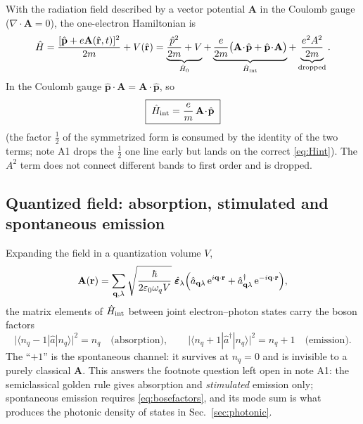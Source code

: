 \documentclass[11pt,a4paper]{article}
\numberwithin{equation}{section}
\newcommand{\eps}{\varepsilon}
\newcommand{\epsz}{\varepsilon_0}
\newcommand{\rme}{\mathrm{e}}
\begin{document}
With the radiation field described by a vector potential $\mathbf{A}$
in the Coulomb gauge ($\nabla\!\cdot\!\mathbf{A}=0$), the one-electron
Hamiltonian is
\begin{equation}
\hat H=\frac{[\hat{\mathbf p}+e\mathbf A(\hat{\mathbf r},t)]^2}{2m}+V(\hat{\mathbf r})
      =\underbrace{\frac{\hat p^2}{2m}+V}_{\hat H_0}
       +\underbrace{\frac{e}{2m}\bigl(\mathbf A\!\cdot\!\hat{\mathbf p}
        +\hat{\mathbf p}\!\cdot\!\mathbf A\bigr)}_{\hat H_{\rm int}}
       +\underbrace{\frac{e^2A^2}{2m}}_{\text{dropped}} .
\end{equation}
In the Coulomb gauge $\hat{\mathbf p}\!\cdot\!\mathbf A
=\mathbf A\!\cdot\!\hat{\mathbf p}$, so
\begin{equation}
\boxed{\;\hat H_{\rm int}=\frac{e}{m}\,\mathbf A\!\cdot\!\hat{\mathbf p}\;}
\label{eq:Hint}
\end{equation}
(the factor $\tfrac12$ of the symmetrized form is consumed by the
identity of the two terms; note A1 drops the $\tfrac12$ one line early
but lands on the correct \eqref{eq:Hint}).  The $A^2$ term does not
connect different bands to first order and is dropped.

\subsection{Quantized field: absorption, stimulated and spontaneous emission}
\label{sec:quantized}

Expanding the field in a quantization volume $V$,
\begin{equation}
\mathbf A(\mathbf r)=\sum_{\mathbf q,\lambda}
\sqrt{\frac{\hbar}{2\epsz\omega_q V}}\;\hat{\bm\eps}_\lambda
\Bigl(\hat a_{\mathbf q\lambda}\,\rme^{i\mathbf q\cdot\mathbf r}
     +\hat a^\dagger_{\mathbf q\lambda}\,\rme^{-i\mathbf q\cdot\mathbf r}\Bigr),
\label{eq:Aquant}
\end{equation}
the matrix elements of $\hat H_{\rm int}$ between joint
electron--photon states carry the boson factors
\begin{equation}
\bigl|\langle n_q-1|\hat a|n_q\rangle\bigr|^2=n_q
\quad\text{(absorption)},\qquad
\bigl|\langle n_q+1|\hat a^\dagger|n_q\rangle\bigr|^2=n_q+1
\quad\text{(emission)} .
\label{eq:bosefactors}
\end{equation}
The ``$+1$'' is the spontaneous channel: it survives at $n_q=0$ and is
invisible to a purely classical $\mathbf A$.  This answers the
footnote question left open in note A1: the semiclassical golden rule
gives absorption and \emph{stimulated} emission only; spontaneous
emission requires \eqref{eq:bosefactors}, and its mode sum is what
produces the photonic density of states in Sec.~\ref{sec:photonic}.
\end{document}
